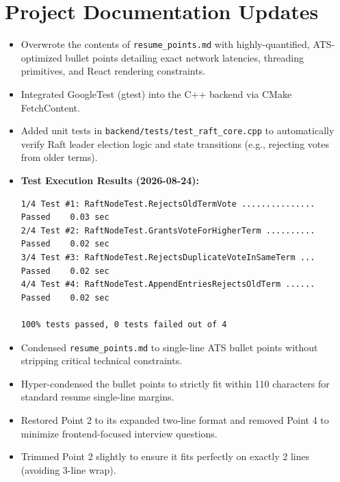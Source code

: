 \documentclass[11pt, a4paper]{article}
\begin{document}
\section*{Project Documentation Updates}
\begin{itemize}
    \item Overwrote the contents of \texttt{resume\_points.md} with highly-quantified, ATS-optimized bullet points detailing exact network latencies, threading primitives, and React rendering constraints.
    \item Integrated GoogleTest (gtest) into the C++ backend via CMake FetchContent.
    \item Added unit tests in \texttt{backend/tests/test\_raft\_core.cpp} to automatically verify Raft leader election logic and state transitions (e.g., rejecting votes from older terms).
    \item \textbf{Test Execution Results (2026-08-24):} 
    \begin{verbatim}
1/4 Test #1: RaftNodeTest.RejectsOldTermVote ...............   Passed    0.03 sec
2/4 Test #2: RaftNodeTest.GrantsVoteForHigherTerm ..........   Passed    0.02 sec
3/4 Test #3: RaftNodeTest.RejectsDuplicateVoteInSameTerm ...   Passed    0.02 sec
4/4 Test #4: RaftNodeTest.AppendEntriesRejectsOldTerm ......   Passed    0.02 sec

100% tests passed, 0 tests failed out of 4
    \end{verbatim}
    \item Condensed \texttt{resume\_points.md} to single-line ATS bullet points without stripping critical technical constraints.
    \item Hyper-condensed the bullet points to strictly fit within 110 characters for standard resume single-line margins.
    \item Restored Point 2 to its expanded two-line format and removed Point 4 to minimize frontend-focused interview questions.
    \item Trimmed Point 2 slightly to ensure it fits perfectly on exactly 2 lines (avoiding 3-line wrap).
\end{itemize}
\end{document}

